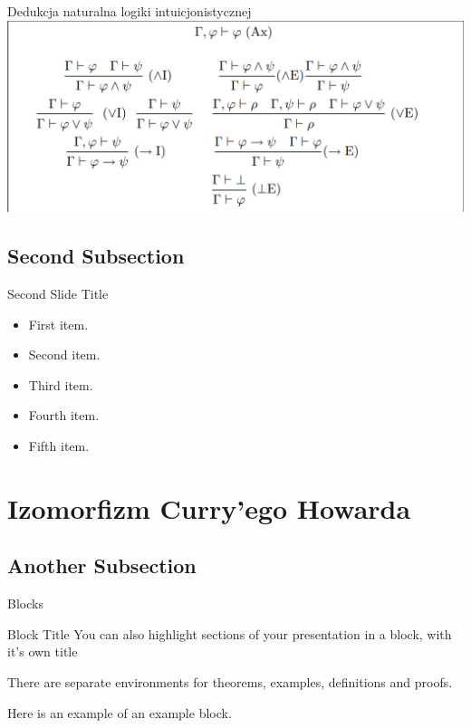 \documentclass{beamer}
\begin{document}
\begin{frame}{Dedukcja naturalna logiki intuicjonistycznej}
 \includegraphics[scale=0.25]{dedukcja.png}
\end{frame}

\subsection{Second Subsection}

\begin{frame}{Second Slide Title}
  \begin{itemize}
  \item {
    First item.
    \pause %
  }
  \item {   
    Second item.
  }
  \item<3-> {
    Third item.
  }
  \item<4-> {
    Fourth item.
  }
  \item<5-> {
    Fifth item. 
  }
  \end{itemize}
\end{frame}

\section{Izomorfizm Curry'ego Howarda}

\subsection{Another Subsection}

\begin{frame}{Blocks}
\begin{block}{Block Title}
You can also highlight sections of your presentation in a block, with it's own title
\end{block}
\begin{theorem}
There are separate environments for theorems, examples, definitions and proofs.
\end{theorem}
\begin{example}
Here is an example of an example block.
\end{example}
\end{frame}
\end{document}

